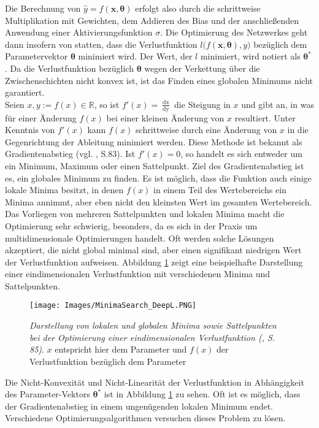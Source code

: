 \documentclass[a4paper,11pt]{article}
\begin{document}
Die Berechnung von $\hat{y} = f(\bm{x}, \bm{\theta})$ erfolgt also durch die schrittweise Multiplikation mit Gewichten, dem Addieren des Bias und der anschließenden Anwendung einer Aktivierungsfunktion $\sigma$.
Die Optimierung des Netzwerkes geht dann insofern von statten, dass die Verlustfunktion $l \bigl(f(\bm{x}, \bm{\theta}), y \bigr)$ bezüglich dem Parametervektor $\bm{\theta}$ minimiert wird.
Der Wert, der $l$ minimiert, wird notiert als $\bm{\theta}^\ast$ . Da die Verlustfunktion bezüglich $\bm{\theta}$ wegen der Verkettung über die Zwischenschichten nicht konvex ist, ist das Finden eines globalen Minimums nicht garantiert. \\
Seien $x, y := f(x) \in \mathbb{R}$, so ist $f'(x) = \frac{\mathop{dx}}{\mathop{dy}}$ die Steigung in $x$ und gibt an, in was für einer Änderung $f(x)$ bei einer kleinen Änderung von $x$ resultiert. Unter Kenntnis von $f'(x)$ kann $f(x)$ schrittweise durch eine Änderung von $x$ in die Gegenrichtung der Ableitung minimiert werden. Diese Methode ist bekannt als Gradientenabstieg (vgl. \cite{deepL}, S.83). 
Ist $f'(x) = 0$, so handelt es sich entweder um ein Minimum, Maximum oder einen Sattelpunkt. Ziel des Gradientenabstieg ist es, ein globales Minimum zu finden. Es ist möglich, dass die Funktion auch einige lokale Minima besitzt, in denen $f(x)$ in einem Teil des Wertebereichs ein Minima annimmt, aber eben nicht den kleinsten Wert im gesamten Wertebereich. Das Vorliegen von mehreren Sattelpunkten und lokalen Minima macht die Optimierung sehr schwierig, besonders, da es sich in der Praxis um multidimensionale Optimierungen handelt. Oft werden solche Lösungen akzeptiert, die nicht global minimal sind, aber einen signifikant niedrigen Wert der Verlustfunktion aufweisen. Abbildung \ref{abb:MinimaSearch} zeigt eine beispielhafte Darstellung einer eindimensionalen Verlustfunktion mit verschiedenen Minima und Sattelpunkten.

\begin{figure}[!ht]
\begin{center}
\texttt{[image: Images/MinimaSearch\_DeepL.PNG]}
\caption{\textit{Darstellung von lokalen und globalen Minima sowie Sattelpunkten bei der Optimierung einer eindimensionalen Verlustfunktion (\cite{deepL}, S. 85)}. $x$ entspricht hier dem Parameter und $f(x)$ der Verlustfunktion bezüglich dem Parameter}
\label{abb:MinimaSearch}
\end{center}
\end{figure}

Die Nicht-Konvexität und Nicht-Linearität der Verlustfunktion in Abhängigkeit des Parameter-Vektors $\bm{\theta}^\ast$ ist in Abbildung \ref{abb:MinimaSearch} zu sehen. Oft ist es möglich, dass der Gradientenabstieg in einem ungenügenden lokalen Minimum endet. Verschiedene Optimierungsalgorithmen versuchen dieses Problem zu lösen.\\
\end{document}
